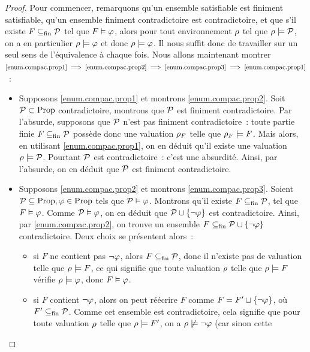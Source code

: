 \begin{proof}
  Pour commencer, remarquons qu'un ensemble satisfiable est finiment
  satisfiable, qu'un ensemble finiment contradictoire est contradictoire, et que
  s'il existe $F\subseteq_{\mathrm{fin}} \mathcal P$ tel que $F\vDash \varphi$, alors pour tout
  environnement $\rho$ tel que $\rho\models \mathcal P$, on a en particulier
  $\rho\models \varphi$ et donc $\rho\models \varphi$. Il nous suffit donc de
  travailler sur
  un seul sens de l'équivalence à chaque fois. Nous allons maintenant montrer
  $\ref{enum.compac.prop1}\implies\ref{enum.compac.prop2}\implies
  \ref{enum.compac.prop3}\implies\ref{enum.compac.prop1}$~:
  \begin{itemize}
  \item Supposons \ref{enum.compac.prop1} et montrons \ref{enum.compac.prop2}.
    Soit $\mathcal P\subset \operatorname{Prop}$ contradictoire, montrons que $\mathcal P$
    est finiment contradictoire. Par l'absurde, supposons que $\mathcal P$ n'est
    pas finiment contradictoire~: toute partie finie $F\subseteq_{\mathrm{fin}} \mathcal P$
    possède donc une valuation $\rho_F$ telle que $\rho_F\models F$. Mais alors,
    en utilisant \ref{enum.compac.prop1}, on en déduit qu'il existe une
    valuation $\rho\models \mathcal P$. Pourtant $\mathcal P$ est
    contradictoire~: c'est une absurdité. Ainsi, par l'absurde, on en déduit que
    $\mathcal P$ est finiment contradictoire.
  \item Supposons \ref{enum.compac.prop2} et montrons \ref{enum.compac.prop3}.
    Soient $\mathcal P\subseteq\operatorname{Prop}, \varphi\in\operatorname{Prop}$ tels que
    $\mathcal P\vDash \varphi$.
    Montrons qu'il existe $F\subseteq_{\mathrm{fin}}\mathcal P$, tel que $F\vDash \varphi$. Comme
    $\mathcal P\vDash \varphi$, on en déduit que $\mathcal P \cup \{\lnot \varphi\}$ est
    contradictoire. Ainsi, par \ref{enum.compac.prop2}, on trouve un ensemble
    $F\subseteq_{\mathrm{fin}} \mathcal P \cup \{\lnot \varphi\}$ contradictoire. Deux choix se
    présentent alors~:
    \begin{itemize}
    \item si $F$ ne contient pas $\lnot \varphi$, alors $F\subseteq_{\mathrm{fin}} \mathcal P$, donc
      il n'existe pas de valuation telle que $\rho\models F$, ce qui signifie
      que toute valuation $\rho$ telle que $\rho\models F$ vérifie
      $\rho\models \varphi$, donc $F\vDash \varphi$.
    \item si $F$ contient $\lnot \varphi$, alors on peut réécrire $F$ comme
      $F = F'\sqcup\{\lnot \varphi\}$, où
      $F'\subseteq_{\mathrm{fin}} \mathcal P$. Comme cet ensemble
      est contradictoire, cela signifie que pour toute valuation $\rho$ telle
      que $\rho\models F'$, on a $\rho\not\models \lnot \varphi$ (car sinon cette

\end{itemize}
\end{itemize}
\end{proof}
